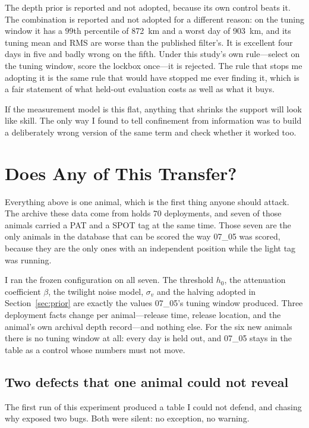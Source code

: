 \documentclass[conference]{IEEEtran}
\begin{document}
The depth prior is reported and not adopted, because its own control beats it.
The combination is reported and not adopted for a different reason: on the
tuning window it has a $99$th percentile of \SI{872}{\km} and a worst day of
\SI{903}{\km}, and its tuning mean and RMS are worse than the published
filter's. It is excellent four days in five and badly wrong on the fifth.
Under this study's own rule---select on the tuning window, score the lockbox
once---it is rejected. The rule that stops me adopting it is the same rule that
would have stopped me ever finding it, which is a fair statement of what
held-out evaluation costs as well as what it buys.

If the measurement model is this flat, anything that shrinks the support will
look like skill. The only way I found to tell confinement from information was
to build a deliberately wrong version of the same term and check whether it
worked too.

\section{Does Any of This Transfer?}
\label{sec:cohort}

Everything above is one animal, which is the first thing anyone should attack.
The archive these data come from holds $70$ deployments, and seven of those
animals carried a PAT and a SPOT tag at the same time. Those seven are the only
animals in the database that can be scored the way 07\_05 was scored, because
they are the only ones with an independent position while the light tag was
running.

I ran the frozen configuration on all seven. The threshold $h_0$, the
attenuation coefficient $\beta$, the twilight noise model, $\sigma_v$ and the
halving adopted in Section~\ref{sec:prior} are exactly the values 07\_05's
tuning window produced. Three deployment facts change per animal---release
time, release location, and the animal's own archival depth record---and
nothing else. For the six new animals there is no tuning window at all: every
day is held out, and 07\_05 stays in the table as a control whose numbers must
not move.

\subsection{Two defects that one animal could not reveal}

The first run of this experiment produced a table I could not defend, and
chasing why exposed two bugs. Both were silent: no exception, no warning.
\end{document}
